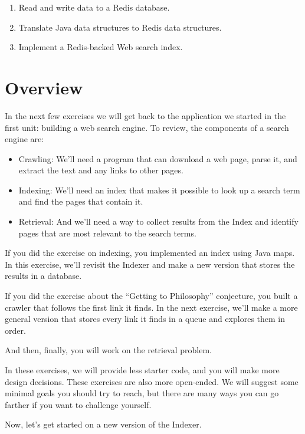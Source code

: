\documentclass[12pt]{book}
\theoremstyle{exercise}
\begin{document}
{\begin{enumerate}
\def\labelenumi{\arabic{enumi}.}
\itemsep1pt\parskip0pt
\item
  Read and write data to a Redis database.
\item
  Translate Java data structures to Redis data structures.
\item
  Implement a Redis-backed Web search index.
\end{enumerate}

\section{Overview}\label{overview-16}

In the next few exercises we will get back to the application we started in
the first unit: building a web search engine. To review, the components
of a search engine are:

\begin{itemize}
\item
  Crawling: We'll need a program that can download a web page, parse it,
  and extract the text and any links to other pages.
\item
  Indexing: We'll need an index that makes it possible to look up a
  search term and find the pages that contain it.
\item
  Retrieval: And we'll need a way to collect results from the Index and
  identify pages that are most relevant to the search terms.
\end{itemize}

If you did the exercise on indexing, you implemented an index using Java
maps. In this exercise, we'll revisit the Indexer and make a new version that
stores the results in a database.

If you did the exercise about the ``Getting to Philosophy'' conjecture, you
built a crawler that follows the first link it finds. In the next exercise,
we'll make a more general version that stores every link it finds in a
queue and explores them in order.

And then, finally, you will work on the retrieval problem.

In these exercises, we will provide less starter code, and you will make more
design decisions. These exercises are also more open-ended. We will suggest
some minimal goals you should try to reach, but there are many ways you
can go farther if you want to challenge yourself.

Now, let's get started on a new version of the Indexer.

}
\end{document}
